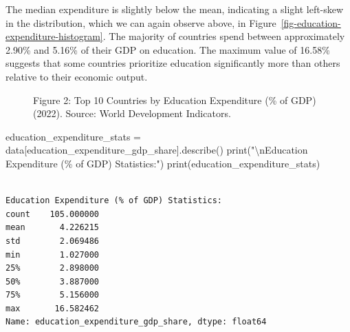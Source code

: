 \documentclass[
]{article}
\newenvironment{Shaded}{\begin{snugshade}}{\end{snugshade}}
\newcommand{\BuiltInTok}[1]{\textcolor[rgb]{0.00,0.23,0.31}{#1}}
\newcommand{\CharTok}[1]{\textcolor[rgb]{0.13,0.47,0.30}{#1}}
\newcommand{\NormalTok}[1]{\textcolor[rgb]{0.00,0.23,0.31}{#1}}
\newcommand{\OperatorTok}[1]{\textcolor[rgb]{0.37,0.37,0.37}{#1}}
\newcommand{\SpecialCharTok}[1]{\textcolor[rgb]{0.37,0.37,0.37}{#1}}
\newcommand{\StringTok}[1]{\textcolor[rgb]{0.13,0.47,0.30}{#1}}
\begin{document}
The median expenditure is slightly below the mean, indicating a slight
left-skew in the distribution, which we can again observe above, in
Figure~\ref{fig-education-expenditure-histogram}. The majority of
countries spend between approximately 2.90\% and 5.16\% of their GDP on
education. The maximum value of 16.58\% suggests that some countries
prioritize education significantly more than others relative to their
economic output.

\begin{figure}


\caption{\label{fig-education-expenditure}Figure 2: Top 10 Countries by
Education Expenditure (\% of GDP) (2022). Source: World Development
Indicators.}

\end{figure}%

\label{education-expenditure-summary-stats}
\begin{Shaded}
\begin{Highlighting}[]
\NormalTok{education\_expenditure\_stats }\OperatorTok{=}\NormalTok{ data[}\StringTok{\textquotesingle{}education\_expenditure\_gdp\_share\textquotesingle{}}\NormalTok{].describe()}
\BuiltInTok{print}\NormalTok{(}\StringTok{"}\CharTok{\textbackslash{}n}\StringTok{Education Expenditure (}\SpecialCharTok{\% o}\StringTok{f GDP) Statistics:"}\NormalTok{)}
\BuiltInTok{print}\NormalTok{(education\_expenditure\_stats)}
\end{Highlighting}
\end{Shaded}

\begin{verbatim}

Education Expenditure (% of GDP) Statistics:
count    105.000000
mean       4.226215
std        2.069486
min        1.027000
25%        2.898000
50%        3.887000
75%        5.156000
max       16.582462
Name: education_expenditure_gdp_share, dtype: float64
\end{verbatim}
\end{document}
